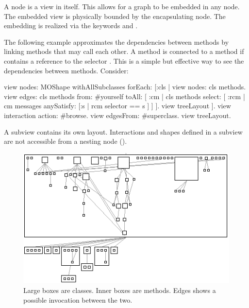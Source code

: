 \documentclass[a4paper,10pt,twoside]{book}
\begin{document}
A node is a view in itself. This allows for a graph to be embedded in any node. The embedded view is physically bounded by the encapsulating node. The embedding is realized via the keywords  and . 

The following example approximates the dependencies between methods by linking methods that may call each other. A method  is connected to a method  if  contains a reference to the selector . This is a simple but effective way to see the dependencies between methods. Consider:

\begin{code}{}
view nodes: MOShape withAllSubclasses forEach: [:cls |
	view nodes: cls methods.
	view edges: cls methods from: #yourself toAll: [ :cm | cls methods select: [ :rcm |  cm messages anySatisfy: [:s | rcm selector == s ] ] ].
	view treeLayout
].
view interaction action: #browse.
view edgesFrom: #superclass.
view treeLayout.
\end{code}

A subview contains its own layout. Interactions and shapes defined in a subview are not accessible from a nesting node (). 



\begin{figure}[htbp]
\centerline{\includegraphics[width=0.6\linewidth]{methodDependencies.png}}
\caption{Large boxes are classes. Inner boxes are methods. Edges shows a possible invocation between the two.}
\label{fig:abstractClasses3}
\end{figure}
\end{document}
